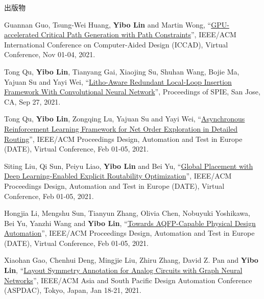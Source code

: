 \begin{rSection}{出版物}
\begin{description}[font=\normalfont, rightmargin=2em]
{}
            

\item[{[C49]}]{
        Guannan Guo, Tsung-Wei Huang, \textbf{Yibo Lin} and Martin Wong, 
    ``\href{https://doi.org/10.1109/ICCAD51958.2021.9643504}{GPU-accelerated Critical Path Generation with Path Constraints}'', 
    IEEE/ACM International Conference on Computer-Aided Design (ICCAD), Virtual Conference, Nov 01-04, 2021.
    
}
            

\item[{[C48]}]{
        Tong Qu, \textbf{Yibo Lin}, Tianyang Gai, Xiaojing Su, Shuhan Wang, Bojie Ma, Yajuan Su and Yayi Wei, 
    ``\href{https://doi.org/10.1117/12.2601685}{Litho-Aware Redundant Local-Loop Insertion Framework With Convolutional Neural Network}'', 
    Proceedings of SPIE, San Jose, CA, Sep 27, 2021.
    
}
            

\item[{[C47]}]{
        Tong Qu, \textbf{Yibo Lin}, Zongqing Lu, Yajuan Su and Yayi Wei, 
    ``\href{https://doi.org/10.23919/DATE51398.2021.9474007}{Asynchronous Reinforcement Learning Framework for Net Order Exploration in Detailed Routing}'', 
    IEEE/ACM Proceedings Design, Automation and Test in Europe (DATE), Virtual Conference, Feb 01-05, 2021.
    
}
            

\item[{[C46]}]{
        Siting Liu, Qi Sun, Peiyu Liao, \textbf{Yibo Lin} and Bei Yu, 
    ``\href{https://doi.org/10.23919/DATE51398.2021.9473959}{Global Placement with Deep Learning-Enabled Explicit Routability Optimization}'', 
    IEEE/ACM Proceedings Design, Automation and Test in Europe (DATE), Virtual Conference, Feb 01-05, 2021.
    
}
            

\item[{[C45]}]{
        Hongjia Li, Mengshu Sun, Tianyun Zhang, Olivia Chen, Nobuyuki Yoshikawa, Bei Yu, Yanzhi Wang and \textbf{Yibo Lin}, 
    ``\href{https://doi.org/10.23919/DATE51398.2021.9474259}{Towards AQFP-Capable Physical Design Automation}'', 
    IEEE/ACM Proceedings Design, Automation and Test in Europe (DATE), Virtual Conference, Feb 01-05, 2021.
    
}
            

\item[{[C44]}]{
        Xiaohan Gao, Chenhui Deng, Mingjie Liu, Zhiru Zhang, David Z. Pan and \textbf{Yibo Lin}, 
    ``\href{https://doi.org/10.1145/3394885.3431545}{Layout Symmetry Annotation for Analog Circuits with Graph Neural Networks}'', 
    IEEE/ACM Asia and South Pacific Design Automation Conference (ASPDAC), Tokyo, Japan, Jan 18-21, 2021.
    
}
\end{description}
\end{rSection}
